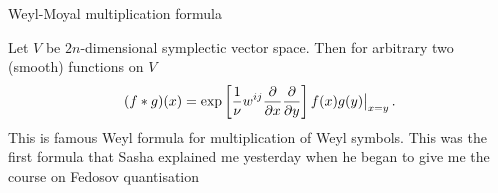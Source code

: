 

\baselineskip=14pt
\def\vare {\varepsilon}
\def\A {{\bf A}}
\def\t {\tilde}
\def\a {\alpha}
\def\K {{\bf K}}
\def\N {{\bf N}}
\def\V {{\cal V}}
\def\s {{\sigma}}
\def\S {{\Sigma}}
\def\s {{\sigma}}
\def\p{\partial}
\def\vare{{\varepsilon}}
\def\Q {{\bf Q}}
\def\D {{\cal D}}
\def\G {{\Gamma}}
\def\C {{\bf C}}
\def\M {{\cal M}}
\def\Z {{\bf Z}}
\def\U  {{\cal U}}
\def\H {{\cal H}}
\def\R  {{\bf R}}
\def\S  {{\bf S}}
\def\E  {{\bf E}}
\def\l {\lambda}
\def\ll {{\bf l}}
\def\degree {{\bf {\rm degree}\,\,}}
\def \finish {${\,\,\vrule height1mm depth2mm width 8pt}$}
\def \m {\medskip}
\def\p {\partial}
\def\r {{\bf r}}
\def\pt {{\bf p}}
\def\v {{\bf v}}
\def\n {{\bf n}}
\def\t {{\bf t}}
\def\b {{\bf b}}
\def\c {{\bf c }}
\def\e{{\bf e}}
\def\ac {{\bf a}}
\def \X   {{\bf X}}
\def \Y   {{\bf Y}}
\def \x   {{\bf x}}
\def \y   {{\bf y}}
\def \G{{\cal G}}
\def\w {{\omega}}
\def \Tr  {{\rm Tr\,}}
\def\V {{\cal V}}

    \centerline {Weyl-Moyal multiplication formula}
Let  $V$  be $2n$-dimensional symplectic vector space.
Then for arbitrary two (smooth) functions on $V$
        $$
   (f*g)(x)=\exp\left[{1\over \nu} w^{ij}
      {\p\over \p x}
      {\p\over \p y}
       \right]
        f(x)g(y)
       \big\vert_{x=y}\,.
        $$
This is famous Weyl formula for multiplication of Weyl symbols.
This was the first formula that Sasha explained me yesterday
when he began to give me the course on Fedosov quantisation
           \bye
